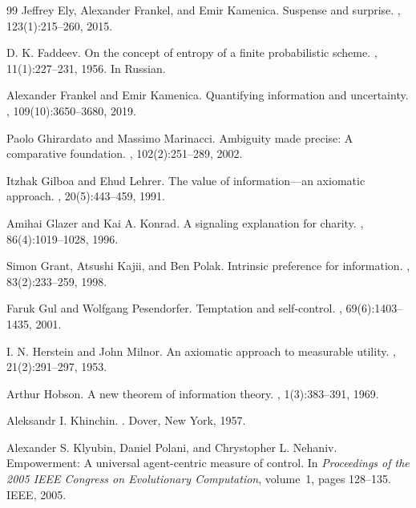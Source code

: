 \documentclass[11pt,a4paper]{article}
\theoremstyle{definition}
\newcommand{\1}{\mathbf 1}
\begin{document}
\begin{thebibliography}{99}
Jeffrey Ely, Alexander Frankel, and Emir Kamenica.
\newblock Suspense and surprise.
, 123(1):215--260, 2015.

D. K. Faddeev.
\newblock On the concept of entropy of a finite probabilistic scheme.
, 11(1):227--231, 1956.
\newblock In Russian.

Alexander Frankel and Emir Kamenica.
\newblock Quantifying information and uncertainty.
, 109(10):3650--3680, 2019.

Paolo Ghirardato and Massimo Marinacci.
\newblock Ambiguity made precise: A comparative foundation.
, 102(2):251--289, 2002.

Itzhak Gilboa and Ehud Lehrer.
\newblock The value of information---an axiomatic approach.
, 20(5):443--459, 1991.

Amihai Glazer and Kai A. Konrad.
\newblock A signaling explanation for charity.
, 86(4):1019--1028, 1996.

Simon Grant, Atsushi Kajii, and Ben Polak.
\newblock Intrinsic preference for information.
, 83(2):233--259, 1998.

Faruk Gul and Wolfgang Pesendorfer.
\newblock Temptation and self-control.
, 69(6):1403--1435, 2001.

I. N. Herstein and John Milnor.
\newblock An axiomatic approach to measurable utility.
, 21(2):291--297, 1953.

Arthur Hobson.
\newblock A new theorem of information theory.
, 1(3):383--391, 1969.

Aleksandr I. Khinchin.
.
\newblock Dover, New York, 1957.

Alexander S. Klyubin, Daniel Polani, and Chrystopher L. Nehaniv.
\newblock Empowerment: A universal agent-centric measure of control.
\newblock In {\em Proceedings of the 2005 IEEE Congress on Evolutionary Computation}, volume~1, pages 128--135. IEEE,
  2005.


\end{thebibliography}
\end{document}
